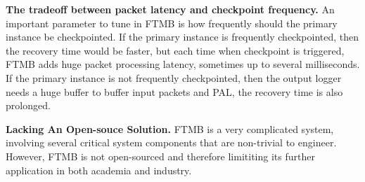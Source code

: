 \textbf{The tradeoff between packet latency and checkpoint frequency.} An
important parameter to tune in FTMB is how frequently should the primary
instance be checkpointed. If the primary instance is frequently checkpointed,
then the recovery time would be faster, but each time when checkpoint is
triggered, FTMB adds huge packet processing latency, sometimes up to several
milliseconds. If the primary instance is not frequently checkpointed, then the
output logger needs a huge buffer to buffer input packets and PAL, the recovery
time is also prolonged.

\textbf{Lacking An Open-souce Solution.} FTMB is a very complicated system,
involving several critical system components that are non-trivial to
engineer. However, FTMB is not open-sourced and therefore limititing its further
application in both academia and industry.


